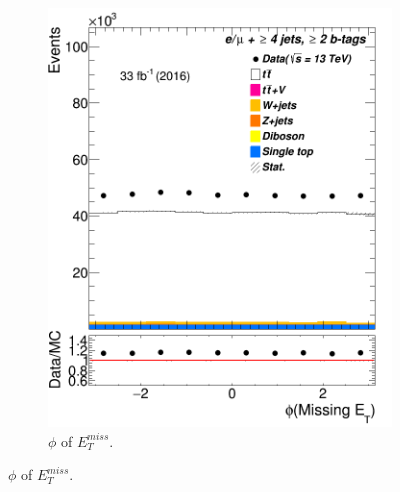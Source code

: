 \begin{figure} [b]
\begin{subfigure}{0.25\textwidth}
	 	\includegraphics[width=\linewidth]{ControlPlots_emujets_2016_4incl_2incl/met_phi_emujets_2016.png}
	 	\caption{$\phi$ of $E_T^{miss}$.} \label{fig:Sec6}
	 \end{subfigure}

 
 


\end{figure}

